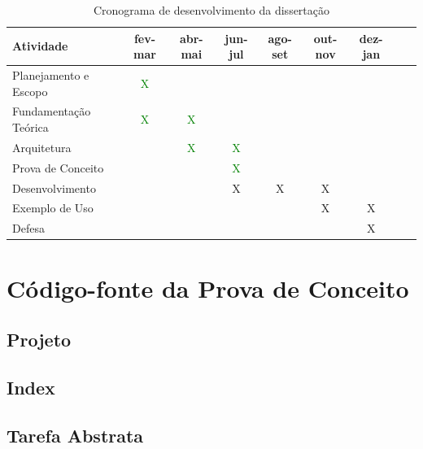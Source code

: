 \documentclass[12pt]{tcc}
\begin{document}
\begin{table}[!ht]
	\centering
	\caption{Cronograma de desenvolvimento da dissertação}
	\begin{tabular}{l  c  c  c  c  c  c L{1.5cm} R{1.5cm}}
		\toprule
		\textbf{Atividade} & \textbf{fev-mar} & \textbf{abr-mai} & \textbf{jun-jul} & \textbf{ago-set} & \textbf{out-nov} & \textbf{dez-jan} \\
		\midrule
		Planejamento e Escopo  &  \textcolor{green}X  &    &    &    &    &    \\
		Fundamentação Teórica  &  \textcolor{green}X  &  \textcolor{green}X  &    &    &    &    \\
		Arquitetura  &    &  \textcolor{green}X  &  \textcolor{green}X  &    &    &    \\
		Prova de Conceito  &    &    &  \textcolor{green}X  &    &    &    \\
		Desenvolvimento  &    &    &  X  &  X  &  X  &    \\
		Exemplo de Uso  &    &    &    &    &  X  &  X  \\
		Defesa  &    &    &    &    &    &  X  \\
		\bottomrule
	\end{tabular}
	\label{tab:cronograma}
\end{table}

\label{bibpage}
\renewcommand\bibname{Referências}

%

\label{bibfinalpage}

\label{lastpage}

\appendix
\chapter{Código-fonte da Prova de Conceito}

\section{Projeto}


\section{Index}


\section{Tarefa Abstrata}

\end{document}
